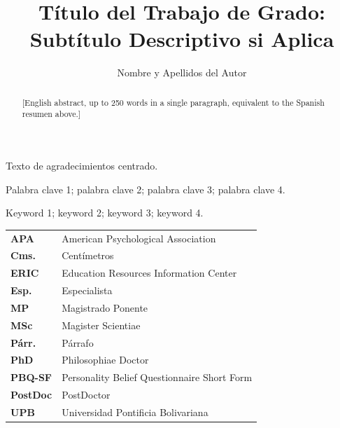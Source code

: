\documentclass[12pt,oneside,onehalfspace,apa,spanish]{upbthesis}
\title{Título del Trabajo de Grado: Subtítulo Descriptivo si Aplica}
\author{Nombre y Apellidos del Autor}
\begin{document}
\frontmatter

\maketitle          %
\originality        %

\begin{dedication}
\end{dedication}

\begin{acknowledgements}
Texto de agradecimientos centrado.
\end{acknowledgements}

\begin{resumen}
\end{resumen}
\begin{pclave}
Palabra clave 1; palabra clave 2; palabra clave 3; palabra clave 4.
\end{pclave}

\begin{abstract}
[English abstract, up to 250 words in a single paragraph, equivalent to the
Spanish resumen above.]
\end{abstract}
\begin{keywords}
Keyword 1; keyword 2; keyword 3; keyword 4.
\end{keywords}

\tableofcontents
\listoftables
\listoffigures

\begin{siglas}
\noindent
\begin{tabularx}{\textwidth}{l X}
  \textbf{APA}     & American Psychological Association \\
  \textbf{Cms.}    & Centímetros \\
  \textbf{ERIC}    & Education Resources Information Center \\
  \textbf{Esp.}    & Especialista \\
  \textbf{MP}      & Magistrado Ponente \\
  \textbf{MSc}     & Magister Scientiae \\
  \textbf{Párr.}   & Párrafo \\
  \textbf{PhD}     & Philosophiae Doctor \\
  \textbf{PBQ-SF}  & Personality Belief Questionnaire Short Form \\
  \textbf{PostDoc} & PostDoctor \\
  \textbf{UPB}     & Universidad Pontificia Bolivariana \\
\end{tabularx}
\end{siglas}
\end{document}
